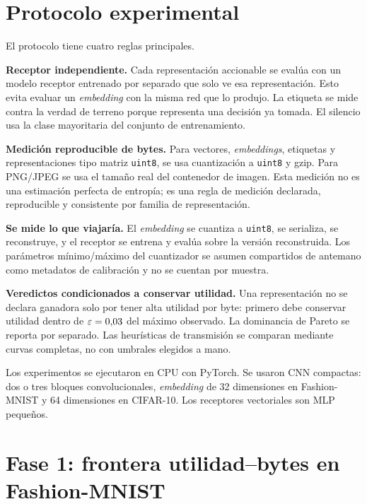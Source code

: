 \section{Protocolo experimental}

El protocolo tiene cuatro reglas principales.

\textbf{Receptor independiente.} Cada representaci\'on accionable se eval\'ua con un modelo receptor entrenado por separado que solo ve esa representaci\'on. Esto evita evaluar un \emph{embedding} con la misma red que lo produjo. La etiqueta se mide contra la verdad de terreno porque representa una decisi\'on ya tomada. El silencio usa la clase mayoritaria del conjunto de entrenamiento.

\textbf{Medici\'on reproducible de bytes.} Para vectores, \emph{embeddings}, etiquetas y representaciones tipo matriz \texttt{uint8}, se usa cuantizaci\'on a \texttt{uint8} y gzip. Para PNG/JPEG se usa el tama\~no real del contenedor de imagen. Esta medici\'on no es una estimaci\'on perfecta de entrop\'ia; es una regla de medici\'on declarada, reproducible y consistente por familia de representaci\'on.

\textbf{Se mide lo que viajar\'ia.} El \emph{embedding} se cuantiza a \texttt{uint8}, se serializa, se reconstruye, y el receptor se entrena y eval\'ua sobre la versi\'on reconstruida. Los par\'ametros m\'inimo/m\'aximo del cuantizador se asumen compartidos de antemano como metadatos de calibraci\'on y no se cuentan por muestra.

\textbf{Veredictos condicionados a conservar utilidad.} Una representaci\'on no se declara ganadora solo por tener alta utilidad por byte: primero debe conservar utilidad dentro de $\varepsilon=0{,}03$ del m\'aximo observado. La dominancia de Pareto se reporta por separado. Las heur\'isticas de transmisi\'on se comparan mediante curvas completas, no con umbrales elegidos a mano.

Los experimentos se ejecutaron en CPU con PyTorch. Se usaron CNN compactas: dos o tres bloques convolucionales, \emph{embedding} de 32 dimensiones en Fashion-MNIST y 64 dimensiones en CIFAR-10. Los receptores vectoriales son MLP peque\~nos.

\section{Fase 1: frontera utilidad--bytes en Fashion-MNIST}


